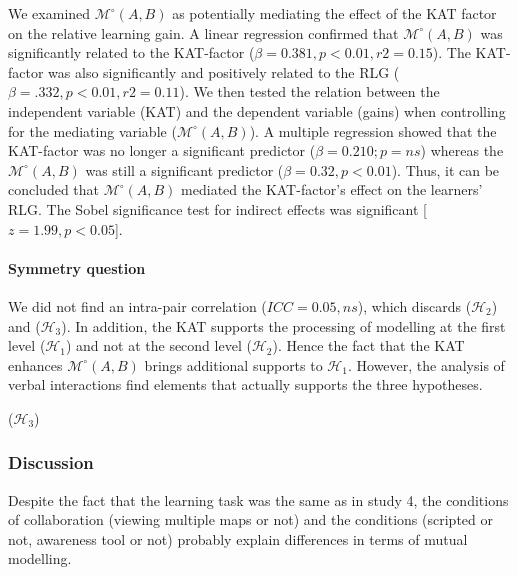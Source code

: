 \documentclass[natbib]{svjour3}
\newcommand{\gmodel}[2]{{$\mathcal{M}(#1, #2)$}}
\newcommand{\gModel}[2]{{$\mathcal{M}^{\circ}(#1, #2)$}}
\begin{document}
We examined \gModel{A}{B} as potentially mediating the effect of the KAT factor
on the relative learning gain. A linear regression confirmed that \gModel{A}{B}
was significantly related to the KAT-factor ($\beta= 0.381, p < 0.01, r2 = 0.15$).
The KAT-factor was also significantly and positively related to the RLG ($\beta=
.332, p < 0.01, r2 = 0.11$). We then tested the relation between the independent
variable (KAT) and the dependent variable (gains) when controlling for the
mediating variable (\gModel{A}{B}). A multiple regression showed that the
KAT-factor was no longer a significant predictor ($\beta= 0.210; p = ns$) whereas
the \gModel{A}{B} was still a significant predictor ($\beta= 0.32, p < 0.01$).
Thus, it can be concluded that \gModel{A}{B} mediated the KAT-factor's effect on
the learners' RLG. The Sobel significance test for indirect effects was
significant [$z = 1.99, p < 0.05$]. 

\paragraph{Symmetry question} We did not find an intra-pair correlation ($ICC =
0.05, ns$), which discards  ($\mathcal{H}_{2}$) and  ($\mathcal{H}_{3}$). In addition, the KAT supports the processing of modelling at the first level ($\mathcal{H}_{1}$) and not at the second level ($\mathcal{H}_{2}$). Hence the fact that the KAT enhances  \gModel{A}{B}  brings additional supports to $\mathcal{H}_{1}$. However, the analysis of verbal interactions find elements that actually supports the three hypotheses.



 ($\mathcal{H}_{3}$) 


\subsubsection*{Discussion}

Despite the fact that the learning task was the same as in study 4, the
conditions of collaboration (viewing multiple maps or not) and the conditions
(scripted or not, awareness tool or not) probably explain differences in terms
of mutual modelling.
\end{document}
